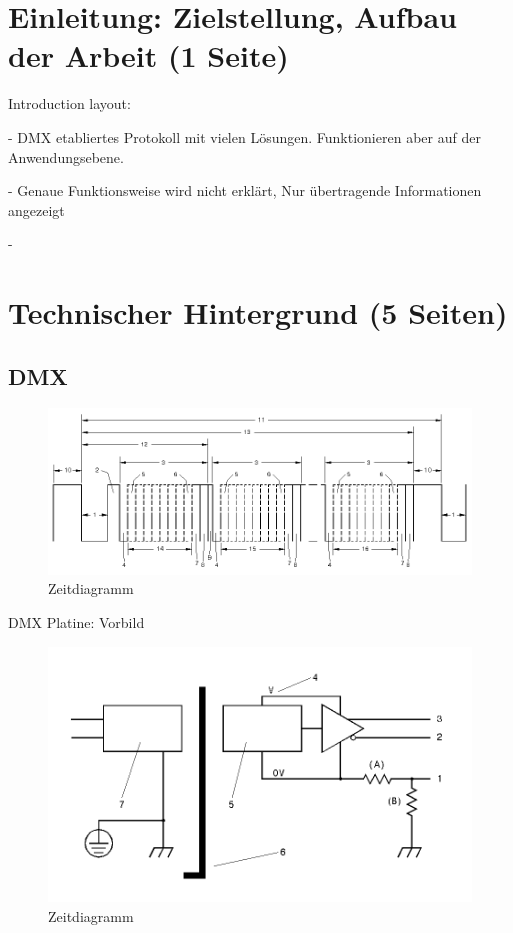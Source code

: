 

\chapter{Einleitung: Zielstellung, Aufbau der Arbeit (1 Seite)}


Introduction layout:

- DMX etabliertes Protokoll mit vielen Lösungen.
Funktionieren aber auf der Anwendungsebene.

- Genaue Funktionsweise wird nicht erklärt, Nur übertragende Informationen angezeigt

-


\label{Chapter2} %





\chapter{Technischer Hintergrund (5 Seiten)}
\section{DMX}

\begin{figure}[H]
	\centering
	\includegraphics[width=\linewidth]{Pictures/DmxTimingFrame}
	\caption{Zeitdiagramm \cite[p.17]{DMX512-Protocol-Standard}}
	\label{fig:DmxTimingFrame}
\end{figure}

DMX Platine: Vorbild

\begin{figure}[H]
	\centering
	\includegraphics[width=0.5\linewidth]{Pictures/DmxIsolation}
	\caption{Zeitdiagramm \cite[p.22]{DMX512-Protocol-Standard}}
	\label{fig:DmxIsolation}
\end{figure}


